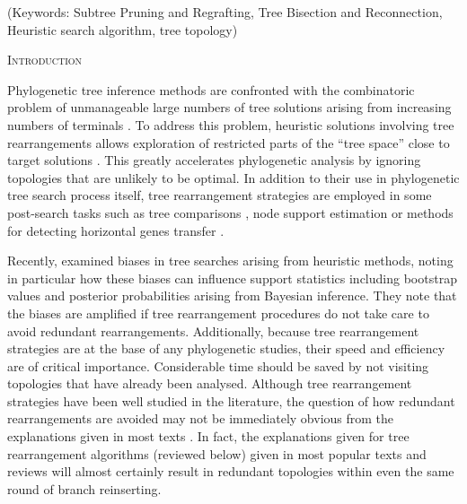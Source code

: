 \documentclass[12pt,letterpaper]{article}
\renewcommand{\section}[1]{%
\bigskip
\begin{center}
\begin{Large}
\normalfont\scshape #1
\medskip
\end{Large}
\end{center}}
\begin{document}
\noindent (Keywords: Subtree Pruning and Regrafting, Tree Bisection and Reconnection, Heuristic search algorithm, tree topology)\\

\vspace{1.5in}

\newpage 

%
%
\section{Introduction}

Phylogenetic tree inference methods are confronted with the combinatoric problem of unmanageable large numbers of tree solutions arising from increasing numbers of terminals \citep{Felsenstein:1978vh}.
To address this problem, heuristic solutions involving tree rearrangements allows exploration of restricted parts of the ``tree space'' close to target solutions \cite{john2016review}.
This greatly accelerates phylogenetic analysis by ignoring topologies that are unlikely to be optimal.
In addition to their use in phylogenetic tree search process itself, tree rearrangement strategies are employed in some post-search tasks such as tree comparisons \citep[e.g.][]{allen2001subtree,kuhner2015treComparison}, node support estimation \citep[e.g.][]{goloboff2014bias} or methods for detecting horizontal genes transfer \citep[e.g.][]{mcfadden1995something,bordewich2005computational}.

Recently, \citet{goloboff2014bias} examined biases in tree searches arising from heuristic methods, noting in particular how these biases can influence support statistics including bootstrap values and posterior probabilities arising from Bayesian inference.
They note that the biases are amplified if tree rearrangement %
procedures do not take care to avoid redundant rearrangements. %
Additionally, because tree rearrangement strategies are at the base of any phylogenetic studies, their speed and efficiency are of critical importance.
Considerable time should be saved by not visiting topologies that have already been analysed.
Although tree rearrangement strategies have been well studied in the literature, the question of how redundant rearrangements are avoided may not be immediately obvious from the explanations given in most texts \citep{swofford2003phylogeny,felsenstein2004inferring,wiley2011phylogenetics}.
In fact, the explanations given for tree rearrangement algorithms (reviewed below) given in most popular texts and reviews will almost certainly result in redundant topologies within even the same round of branch reinserting.
\end{document}
